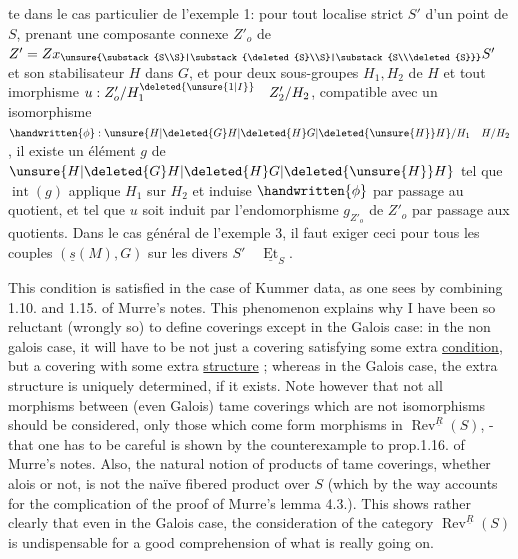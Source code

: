 te dans le cas particulier de l'exemple 1: pour tout localise strict $S'$ d'un point de $S$, prenant une composante connexe $Z'_o$ de $Z'=Zx_{\unsure{\substack{S\\S}|\substack{\deleted{S}\\S}|\substack{S\\\deleted{S}}}}S'$ et son stabilisateur $H$ dans $G$, et pour deux sous-groupes  $H_1,H_2$ de $H$ et tout imorphisme $u:Z'_o/H_1^{\deleted{\unsure{1|I}}}\quad Z'_2/H_2$,  compatible avec un isomorphisme $\handwritten{\phi}:\unsure{H|\deleted{G}H|\deleted{H}G|\deleted{\unsure{H}}H}/H_1\quad H/H_2$, il existe un élément $g$ de $\unsure{H|\deleted{G}H|\deleted{H}G|\deleted{\unsure{H}}H}$ tel que $\operatorname{int}(g)$ applique $H_1$ sur $H_2$ et induise $\handwritten{\phi}$ par passage au quotient, et tel que $u$ soit induit par l'endomorphisme $g_{Z'_o}$ de $Z'_o$ par passage aux quotients. Dans le cas général de l'exemple 3, il faut exiger ceci pour tous les couples $(\underline{s}(M),G)$ sur les divers $S'\quad\underline{\operatorname{Et}}_S$.

This condition is satisfied in the case of Kummer data, as one sees by combining 1.10. and 1.15. of Murre's notes. This phenomenon explains why I have been so reluctant (wrongly so) to define  coverings except in the Galois case: in the non galois case, it will have to be not just a covering satisfying some extra \uline{condition}, but a covering with some extra \uline{structure} ; whereas in the Galois case, the extra structure is uniquely determined, if it exists. Note however that  not all morphisms  between (even Galois) tame coverings which are not isomorphisms should be considered, only those which come form morphisms in $\operatorname{Rev}^{\underline{R}}(S)$, - that one has to be careful is shown by the counterexample to prop.1.16. of Murre's notes. Also, the natural notion of products of tame  coverings, whether alois or not, is not the naïve fibered product over $S$ (which by the way accounts for the complication of the proof of Murre's lemma 4.3.). This shows rather clearly that even in the Galois case, the consideration of the category $\operatorname{Rev}^{\underline{R}}(S)$ is undispensable for a good comprehension of what is really going on.

